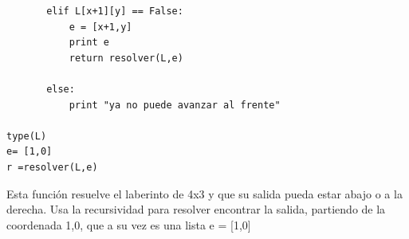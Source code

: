 \documentclass[letterpaper, 12pt,oneside]{article}
\begin{document}
\begin{enumerate}
\begin{itemize}
\begin{lstlisting}
       elif L[x+1][y] == False:
           e = [x+1,y]
           print e
           return resolver(L,e)
           
       else:
           print "ya no puede avanzar al frente"

type(L)                      
e= [1,0]        
r =resolver(L,e)
				\end{lstlisting} Esta función resuelve el laberinto de 4x3 y que su salida pueda estar abajo o a la derecha. Usa la recursividad para resolver encontrar la salida, partiendo de la coordenada 1,0, que a su vez es una lista e = [1,0]
			
				
				
			\end{itemize}
		
		
		
			
			
		
		
	\end{enumerate}
	
	
	
	
	
	
	
	
	
	
	
\end{document}
